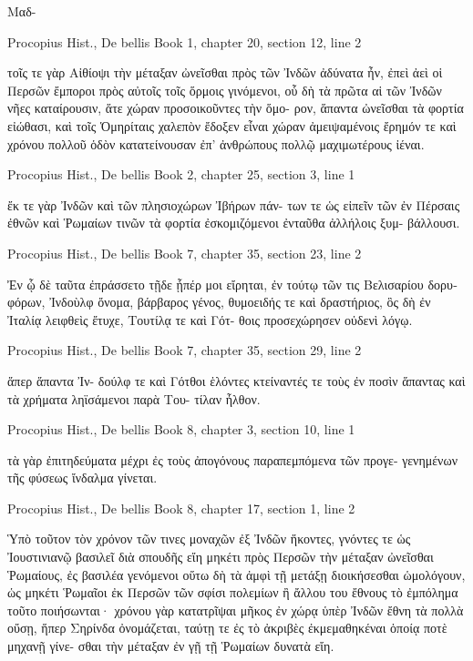\documentclass[12pt,letterpaper,twoside,final]{memoir}
\begin{document}
\begin{greek}
Μαδ-



Procopius Hist., De bellis 
Book 1, chapter 20, section 12, line 2

                                                     τοῖς τε 
γὰρ Αἰθίοψι τὴν μέταξαν ὠνεῖσθαι πρὸς τῶν Ἰνδῶν 
ἀδύνατα ἦν, ἐπεὶ ἀεὶ οἱ Περσῶν ἔμποροι πρὸς αὐτοῖς   
τοῖς ὅρμοις γινόμενοι, οὗ δὴ τὰ πρῶτα αἱ τῶν Ἰνδῶν 
νῆες καταίρουσιν, ἅτε χώραν προσοικοῦντες τὴν ὅμο-
ρον, ἅπαντα ὠνεῖσθαι τὰ φορτία εἰώθασι, καὶ τοῖς 
Ὁμηρίταις χαλεπὸν ἔδοξεν εἶναι χώραν ἀμειψαμένοις 
ἔρημόν τε καὶ χρόνου πολλοῦ ὁδὸν κατατείνουσαν ἐπ' 
ἀνθρώπους πολλῷ μαχιμωτέρους ἰέναι. 



Procopius Hist., De bellis 
Book 2, chapter 25, section 3, line 1

ἔκ τε γὰρ Ἰνδῶν καὶ τῶν πλησιοχώρων Ἰβήρων πάν-  
των τε ὡς εἰπεῖν τῶν ἐν Πέρσαις ἐθνῶν καὶ Ῥωμαίων 
τινῶν τὰ φορτία ἐσκομιζόμενοι ἐνταῦθα ἀλλήλοις ξυμ-
βάλλουσι. 



Procopius Hist., De bellis 
Book 7, chapter 35, section 23, line 2

Ἐν ᾧ δὲ ταῦτα ἐπράσσετο τῇδε ᾗπέρ μοι εἴρηται,   
ἐν τούτῳ τῶν τις Βελισαρίου δορυφόρων, Ἰνδοὺλφ 
ὄνομα, βάρβαρος γένος, θυμοειδής τε καὶ δραστήριος, 
ὃς δὴ ἐν Ἰταλίᾳ λειφθεὶς ἔτυχε, Τουτίλᾳ τε καὶ Γότ-
θοις προσεχώρησεν οὐδενὶ λόγῳ. 



Procopius Hist., De bellis 
Book 7, chapter 35, section 29, line 2

                                         ἅπερ ἅπαντα Ἰν-
δούλφ τε καὶ Γότθοι ἑλόντες κτείναντές τε τοὺς ἐν 
ποσὶν ἅπαντας καὶ τὰ χρήματα ληϊσάμενοι παρὰ Του-
τίλαν ἦλθον. 



Procopius Hist., De bellis 
Book 8, chapter 3, section 10, line 1

                                 τὰ γὰρ ἐπιτηδεύματα 
μέχρι ἐς τοὺς ἀπογόνους παραπεμπόμενα τῶν προγε-
γενημένων τῆς φύσεως ἴνδαλμα γίνεται. 



Procopius Hist., De bellis 
Book 8, chapter 17, section 1, line 2

Ὑπὸ τοῦτον τὸν χρόνον τῶν τινες μοναχῶν 
ἐξ Ἰνδῶν ἥκοντες, γνόντες τε ὡς Ἰουστινιανῷ βασιλεῖ 
διὰ σπουδῆς εἴη μηκέτι πρὸς Περσῶν τὴν μέταξαν 
ὠνεῖσθαι Ῥωμαίους, ἐς βασιλέα γενόμενοι οὕτω δὴ τὰ 
ἀμφὶ τῇ μετάξῃ διοικήσεσθαι ὡμολόγουν, ὡς μηκέτι 
Ῥωμαῖοι ἐκ Περσῶν τῶν σφίσι πολεμίων ἢ ἄλλου του 
ἔθνους τὸ ἐμπόλημα τοῦτο ποιήσωνται· χρόνου γὰρ 
κατατρῖψαι μῆκος ἐν χώρᾳ ὑπὲρ Ἰνδῶν ἔθνη τὰ 
πολλὰ οὔσῃ, ἥπερ Σηρίνδα ὀνομάζεται, ταύτῃ τε ἐς 
τὸ ἀκριβὲς ἐκμεμαθηκέναι ὁποίᾳ ποτὲ μηχανῇ γίνε-
σθαι τὴν μέταξαν ἐν γῇ τῇ Ῥωμαίων δυνατὰ εἴη. 




\end{greek}
\end{document}

